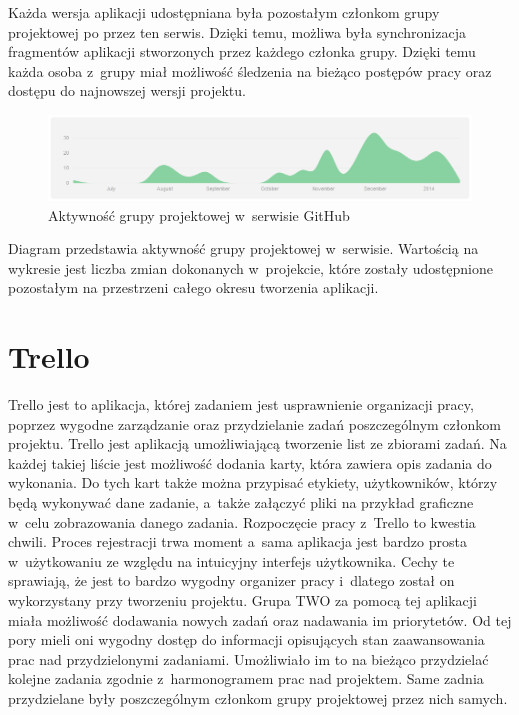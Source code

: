 Każda wersja aplikacji udostępniana była pozostałym członkom grupy projektowej po przez ten serwis. Dzięki temu, możliwa była synchronizacja fragmentów aplikacji stworzonych przez każdego członka grupy. Dzięki temu każda osoba z~grupy miał możliwość śledzenia na bieżąco postępów pracy oraz dostępu do najnowszej wersji projektu. 
\begin{figure}[h]
	\centering
	\includegraphics[width=1.00\textwidth]{images/git.png}
	\caption{Aktywność grupy projektowej w~serwisie GitHub}
\end{figure}

Diagram przedstawia aktywność grupy projektowej w~serwisie. Wartością na wykresie jest liczba zmian dokonanych w~projekcie, które zostały udostępnione pozostałym na przestrzeni całego  okresu tworzenia aplikacji. 

\section{Trello}
Trello jest to aplikacja, której zadaniem jest usprawnienie organizacji pracy, poprzez wygodne zarządzanie oraz przydzielanie zadań poszczególnym członkom projektu. Trello jest aplikacją umożliwiającą tworzenie list ze zbiorami zadań. Na każdej takiej liście jest możliwość dodania karty, która zawiera opis zadania do wykonania. Do tych kart także można przypisać etykiety, użytkowników, którzy będą wykonywać dane zadanie, a~także załączyć pliki  na przykład graficzne w~celu zobrazowania danego zadania. Rozpoczęcie pracy z~Trello  to kwestia chwili. Proces rejestracji trwa moment a~sama aplikacja jest bardzo prosta w~użytkowaniu ze względu na intuicyjny interfejs użytkownika. Cechy te sprawiają, że jest to bardzo wygodny organizer pracy i~dlatego został on wykorzystany przy tworzeniu projektu. Grupa TWO za pomocą tej aplikacji miała możliwość dodawania nowych zadań oraz nadawania im priorytetów. Od tej pory mieli oni wygodny dostęp do informacji opisujących stan zaawansowania prac nad przydzielonymi zadaniami. Umożliwiało im to na bieżąco przydzielać kolejne zadania zgodnie z~harmonogramem prac nad projektem. Same zadnia przydzielane były poszczególnym członkom grupy projektowej przez nich samych. 

